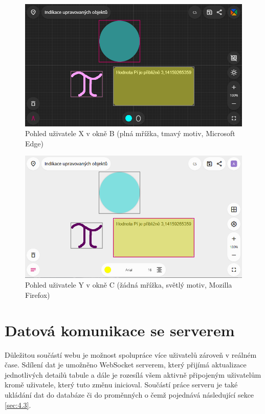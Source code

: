 \begin{figure}[h!]
	\centering
	\includegraphics[width=1\textwidth]{Figures/ObjectIndication2.png}
	\caption{Pohled uživatele X v okně B (plná mřížka, tmavý motiv, Microsoft Edge)}
	\label{fig:ObjectIndication2}
\end{figure}

\begin{figure}[h!]
	\centering
	\includegraphics[width=1\textwidth]{Figures/ObjectIndication3.png}
	\caption{Pohled uživatele Y v okně C (žádná mřížka, světlý motiv, Mozilla Firefox)}
	\label{fig:ObjectIndication3}
\end{figure}
\clearpage




\section{Datová komunikace se serverem}
\label{sec:4.2}
Důležitou součástí webu je možnost spolupráce více uživatelů zároveň v reálném čase.
Sdílení dat je umožněno WebSocket serverem, který přijímá aktualizace jednotlivých detailů tabule a dále je rozesílá všem aktivně připojeným uživatelům kromě uživatele, který tuto změnu inicioval.
Součástí práce serveru je také ukládání dat do databáze či do proměnných o čemž pojednává následující sekce \ref{sec:4.3}.

